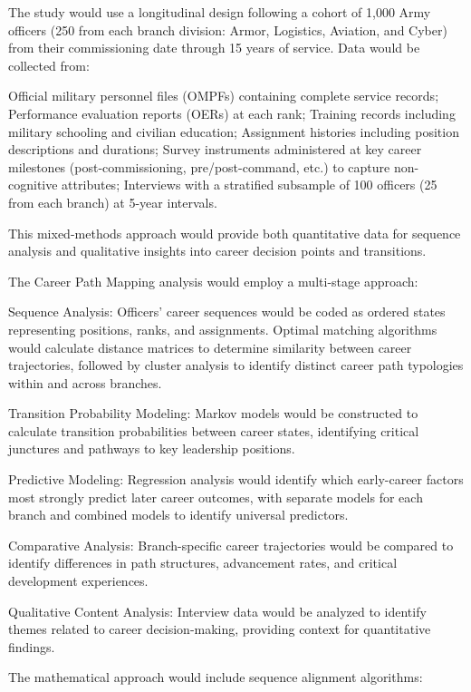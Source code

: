 \documentclass[../main.tex]{subfiles}
\begin{document}
The study would use a longitudinal design following a cohort of 1,000 Army officers (250 from each branch division: Armor, Logistics, Aviation, and Cyber) from their commissioning date through 15 years of service. Data would be collected from:

Official military personnel files (OMPFs) containing complete service records; Performance evaluation reports (OERs) at each rank; Training records including military schooling and civilian education; Assignment histories including position descriptions and durations; Survey instruments administered at key career milestones (post-commissioning, pre/post-command, etc.) to capture non-cognitive attributes; Interviews with a stratified subsample of 100 officers (25 from each branch) at 5-year intervals.

This mixed-methods approach would provide both quantitative data for sequence analysis and qualitative insights into career decision points and transitions.

The Career Path Mapping analysis would employ a multi-stage approach:

Sequence Analysis: Officers' career sequences would be coded as ordered states representing positions, ranks, and assignments. Optimal matching algorithms would calculate distance matrices to determine similarity between career trajectories, followed by cluster analysis to identify distinct career path typologies within and across branches.

Transition Probability Modeling: Markov models would be constructed to calculate transition probabilities between career states, identifying critical junctures and pathways to key leadership positions.

Predictive Modeling: Regression analysis would identify which early-career factors most strongly predict later career outcomes, with separate models for each branch and combined models to identify universal predictors.

Comparative Analysis: Branch-specific career trajectories would be compared to identify differences in path structures, advancement rates, and critical development experiences.

Qualitative Content Analysis: Interview data would be analyzed to identify themes related to career decision-making, providing context for quantitative findings.

The mathematical approach would include sequence alignment algorithms:
\end{document}

